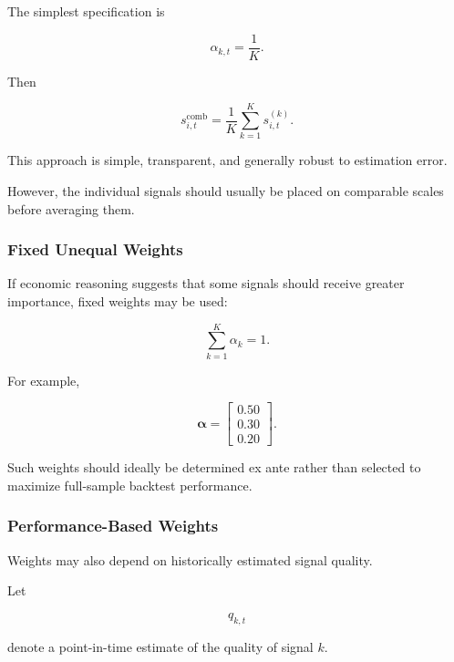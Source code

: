 \documentclass[11pt,a4paper]{article}
\begin{document}
The simplest specification is

\begin{equation}
\alpha_{k,t}
=
\frac{1}{K}.
\end{equation}

Then

\begin{equation}
\boxed{
s_{i,t}^{\mathrm{comb}}
=
\frac{1}{K}
\sum_{k=1}^{K}
s_{i,t}^{(k)}.
}
\end{equation}

This approach is simple, transparent, and generally robust to estimation error.

However, the individual signals should usually be placed on comparable scales
before averaging them.


\subsubsection{Fixed Unequal Weights}

If economic reasoning suggests that some signals should receive greater
importance, fixed weights may be used:

\begin{equation}
\sum_{k=1}^{K}
\alpha_k
=
1.
\end{equation}

For example,

\begin{equation}
\boldsymbol{\alpha}
=
\begin{bmatrix}
0.50\\
0.30\\
0.20
\end{bmatrix}.
\end{equation}

Such weights should ideally be determined ex ante rather than selected to
maximize full-sample backtest performance.


\subsubsection{Performance-Based Weights}

Weights may also depend on historically estimated signal quality.

Let

\begin{equation}
q_{k,t}
\end{equation}

denote a point-in-time estimate of the quality of signal $k$.
\end{document}
